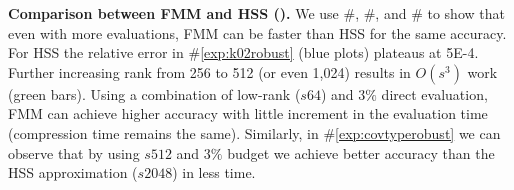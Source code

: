 \textbf{Comparison between FMM and HSS ().}
We use \#\rownumber\label{exp:k02robust}, \#\rownumber\label{exp:k15robust},
and \#\rownumber\label{exp:covtyperobust} to show that even with more
evaluations, FMM can be faster than HSS for the same accuracy. 
For HSS the relative error in \#\ref{exp:k02robust} (blue plots) plateaus at
\num{5E-4}. Further increasing rank from 256 to 512 (or even 1,024) results
in $O(s^3)$ work (green bars). Using a combination of low-rank
($s64$) and $3\%$ direct evaluation, FMM can achieve higher accuracy
with little increment in the evaluation time (compression time remains
the same).  Similarly, in \#\ref{exp:covtyperobust} we can observe that
by using $s512$ and $3\%$ budget we achieve better accuracy than the
HSS approximation ($s2048$) in less time.

